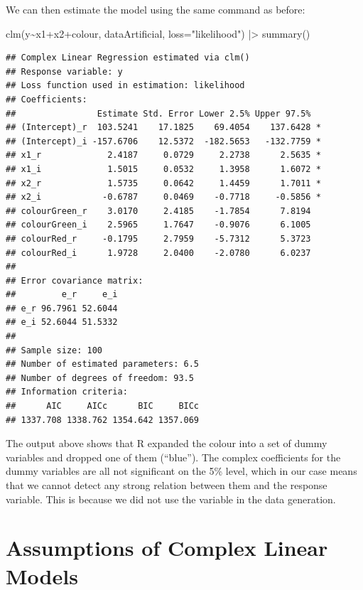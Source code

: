 \documentclass[
]{book}
\newenvironment{Shaded}{\begin{snugshade}}{\end{snugshade}}
\newcommand{\AttributeTok}[1]{\textcolor[rgb]{0.77,0.63,0.00}{#1}}
\newcommand{\FunctionTok}[1]{\textcolor[rgb]{0.00,0.00,0.00}{#1}}
\newcommand{\NormalTok}[1]{#1}
\newcommand{\SpecialCharTok}[1]{\textcolor[rgb]{0.00,0.00,0.00}{#1}}
\newcommand{\StringTok}[1]{\textcolor[rgb]{0.31,0.60,0.02}{#1}}
\begin{document}
We can then estimate the model using the same command as before:

\begin{Shaded}
\begin{Highlighting}[]
\FunctionTok{clm}\NormalTok{(y}\SpecialCharTok{\textasciitilde{}}\NormalTok{x1}\SpecialCharTok{+}\NormalTok{x2}\SpecialCharTok{+}\NormalTok{colour, dataArtificial, }\AttributeTok{loss=}\StringTok{"likelihood"}\NormalTok{) }\SpecialCharTok{|\textgreater{}}
    \FunctionTok{summary}\NormalTok{()}
\end{Highlighting}
\end{Shaded}

\begin{verbatim}
## Complex Linear Regression estimated via clm()
## Response variable: y
## Loss function used in estimation: likelihood
## Coefficients:
##                Estimate Std. Error Lower 2.5% Upper 97.5%  
## (Intercept)_r  103.5241    17.1825    69.4054    137.6428 *
## (Intercept)_i -157.6706    12.5372  -182.5653   -132.7759 *
## x1_r             2.4187     0.0729     2.2738      2.5635 *
## x1_i             1.5015     0.0532     1.3958      1.6072 *
## x2_r             1.5735     0.0642     1.4459      1.7011 *
## x2_i            -0.6787     0.0469    -0.7718     -0.5856 *
## colourGreen_r    3.0170     2.4185    -1.7854      7.8194  
## colourGreen_i    2.5965     1.7647    -0.9076      6.1005  
## colourRed_r     -0.1795     2.7959    -5.7312      5.3723  
## colourRed_i      1.9728     2.0400    -2.0780      6.0237  
## 
## Error covariance matrix:
##         e_r     e_i
## e_r 96.7961 52.6044
## e_i 52.6044 51.5332
## 
## Sample size: 100
## Number of estimated parameters: 6.5
## Number of degrees of freedom: 93.5
## Information criteria:
##      AIC     AICc      BIC     BICc 
## 1337.708 1338.762 1354.642 1357.069
\end{verbatim}

The output above shows that R expanded the colour into a set of dummy variables and dropped one of them (``blue''). The complex coefficients for the dummy variables are all not significant on the 5\% level, which in our case means that we cannot detect any strong relation between them and the response variable. This is because we did not use the variable in the data generation.

\hypertarget{assumptions}{%
\chapter{Assumptions of Complex Linear Models}\label{assumptions}}
\end{document}
